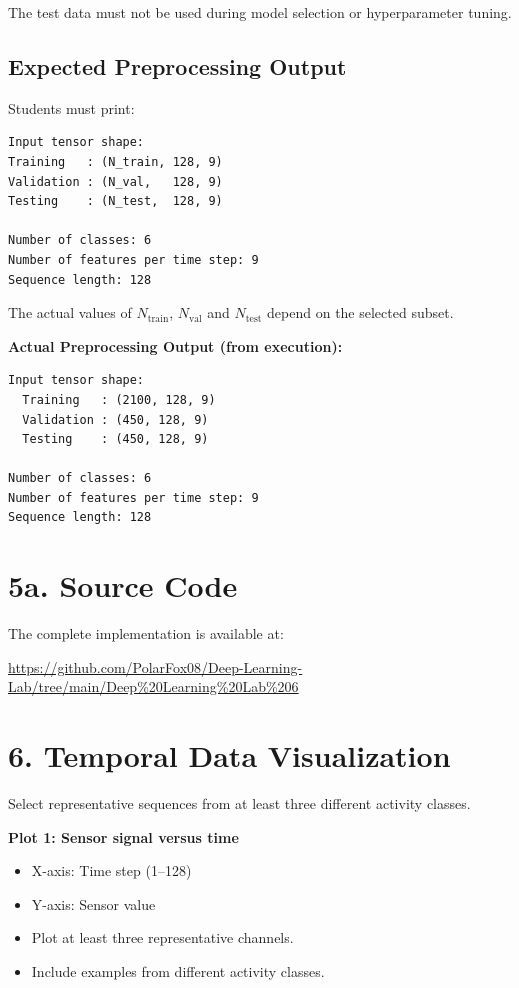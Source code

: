 \documentclass[10pt]{article}
\begin{document}
The test data must not be used during model selection or hyperparameter tuning.

\subsection*{Expected Preprocessing Output}

Students must print:

\begin{verbatim}
Input tensor shape:
Training   : (N_train, 128, 9)
Validation : (N_val,   128, 9)
Testing    : (N_test,  128, 9)

Number of classes: 6
Number of features per time step: 9
Sequence length: 128
\end{verbatim}

The actual values of $N_{\mathrm{train}}$, $N_{\mathrm{val}}$ and
$N_{\mathrm{test}}$ depend on the selected subset.

\textbf{Actual Preprocessing Output (from execution):}

\begin{verbatim}
Input tensor shape:
  Training   : (2100, 128, 9)
  Validation : (450, 128, 9)
  Testing    : (450, 128, 9)

Number of classes: 6
Number of features per time step: 9
Sequence length: 128
\end{verbatim}

\section*{5a. Source Code}

The complete implementation is available at:

\url{https://github.com/PolarFox08/Deep-Learning-Lab/tree/main/Deep%20Learning%20Lab%206}


\section*{6. Temporal Data Visualization}

Select representative sequences from at least three different activity
classes.

\textbf{Plot 1: Sensor signal versus time}

\begin{itemize}
\item X-axis: Time step (1--128)
\item Y-axis: Sensor value
\item Plot at least three representative channels.
\item Include examples from different activity classes.
\end{itemize}
\end{document}

